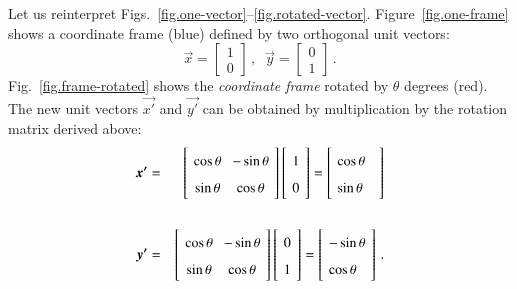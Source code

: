 Let us reinterpret Figs.~\ref{fig.one-vector}--\ref{fig.rotated-vector}. Figure~\ref{fig.one-frame} shows a coordinate frame (blue) defined by two orthogonal unit vectors:
\[
\vec{x}= \left[\begin{array}{c}1\\0\end{array}\right]\,,\;\;
\vec{y}= \left[\begin{array}{c}0\\1\end{array}\right]\,.
\]
Fig.~\ref{fig.frame-rotated} shows the \emph{coordinate frame} rotated by $\theta$ degrees (red). The new unit vectors $\vec{x'}$ and $\vec{y'}$ can be obtained by multiplication by the rotation matrix derived above:
\begin{eqnarray*}
\vec{x'}&=&
\left[\spacearray\begin{array}{cc}\cos\theta&-\sin\theta\\\sin\theta&\cos\theta\end{array}\right]
\left[\spacearray\begin{array}{c}1\\0\end{array}\right]=
\left[\spacearray\begin{array}{l}\cos \theta\\\sin\theta\;\;\:\end{array}\right]\\
\,\\
\vec{y'}&=&
\left[\spacearray\begin{array}{cc}\cos\theta&-\sin\theta\\\sin\theta&\cos\theta\end{array}\right]
\left[\spacearray\begin{array}{c}0\\1\end{array}\right]=
\left[\spacearray\begin{array}{l}-\sin \theta\\\cos\theta\end{array}\right]\,.
\end{eqnarray*}

